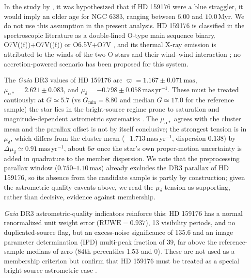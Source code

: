 \documentclass{aa}
\begin{document}
In the study by \citet{2018AA...610A..30A}, it was hypothesized that if HD 159176 were a blue straggler, it would imply an older age for NGC 6383, ranging between $6.00$ and $10.0\,\mathrm{Myr}$. We do not use this assumption in the present analysis. HD 159176 is classified in the spectroscopic literature as a double-lined O-type main sequence binary, O7V((f))+O7V((f)) \citep{1993Obs...113..204S,2007A&A...474..193L} or O6.5V+O7V \citep{2016ApJ...832..211P}, and its thermal X-ray emission is attributed to the winds of the two O stars and their wind--wind interaction \citep{2003AA...407..925R,2004A&A...416..221D}; no accretion-powered scenario has been proposed for this system.

The \textit{Gaia} DR3 values of HD 159176 are $\varpi = 1.167 \pm 0.071\,\mathrm{mas}$, $\mu_{\alpha*}=2.621 \pm 0.083$, and $\mu_{\delta}=-0.798 \pm 0.058\,\mathrm{mas\,yr^{-1}}$. These must be treated cautiously: at $G\simeq5.7$ (vs $G_{\min}=8.80$ and median $G\simeq17.0$ for the reference sample) the star lies in the bright-source regime prone to saturation and magnitude-dependent astrometric systematics \citep{2021A&A...649A...2L,2021A&A...649A...4L,2021A&A...649A.124C,2022A&A...657A.130M}. The $\mu_{\alpha*}$ agrees with the cluster mean and the parallax offset is not by itself conclusive; the strongest tension is in $\mu_{\delta}$, which differs from the cluster mean ($-1.713\,\mathrm{mas\,yr^{-1}}$, dispersion $0.138$) by $\Delta\mu_{\delta}\simeq0.91\,\mathrm{mas\,yr^{-1}}$, about $6\sigma$ once the star's own proper-motion uncertainty is added in quadrature to the member dispersion. We note that the preprocessing parallax window ($0.750$--$1.10\,\mathrm{mas}$) already excludes the DR3 parallax of HD 159176, so its absence from the candidate sample is partly by construction; given the astrometric-quality caveats above, we read the $\mu_{\delta}$ tension as supporting, rather than decisive, evidence against membership.

\textit{Gaia} DR3 astrometric-quality indicators reinforce this: HD 159176 has a normal renormalized unit weight error ($\mathrm{RUWE}=0.937$), 13 visibility periods, and no duplicated-source flag, but an excess-noise significance of 135.6 and an image parameter determination (IPD) multi-peak fraction of 39, far above the reference-sample medians of zero (84th percentiles 1.53 and 0). These are not used as a membership criterion but confirm that HD 159176 must be treated as a special bright-source astrometric case \citep{2022MNRAS.510.2597R}.
\end{document}
